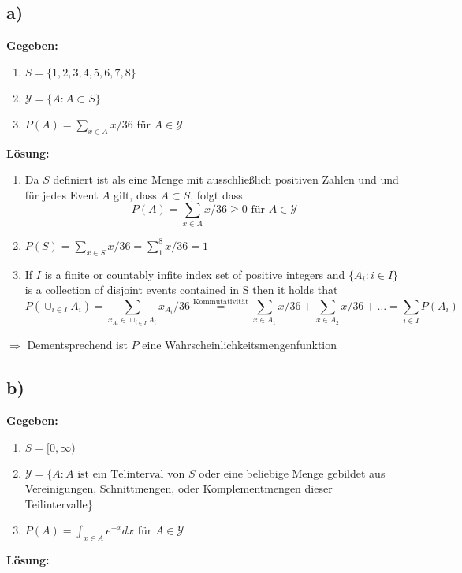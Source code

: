 \documentclass{article}
\begin{document}
\subsection*{a)}
\textbf{Gegeben:}


\begin{enumerate}
    \item $S = \{1,2,3,4,5,6,7,8\}$ 
    \item $\mathcal{Y} = \{A: A \subset S\}$ 
    \item $P(A) = \sum_{x\in A} x / 36$ für $A \in \mathcal{Y}$
\end{enumerate}
\textbf{Lösung:}


\begin{enumerate}[label=zu \roman*.]
    \item Da $S$ definiert ist als eine Menge mit ausschließlich positiven Zahlen und und für jedes Event $A$ gilt, dass $A \subset S$, folgt dass \[P(A) = \sum_{x\in A} x / 36 \geq 0 \text{ für }A \in \mathcal{Y}\]
    \item $P(S) = \sum_{x \in S} x/36 = \sum_{1}^{8}x/36 = 1$
    \item If $I$ is a finite or countably infite index set of positive integers and $\{A_{i}: i \in I\}$ is a collection of disjoint events contained in S then it holds that \[P(\cup_{i\in I}A_{i}) = \sum_{x_{A_{i}} \in \cup_{i\in I}A_{i}}x_{A_{i}}/36 \overset{\text{Kommutativität}}{=} \sum_{x \in A_{1}} x/36 + \sum_{x \in A_{2}} x/36 + \ldots = \sum_{i\in I}P(A_{i})\]  
\end{enumerate}

$\Longrightarrow$ Dementsprechend ist $P$ eine Wahrscheinlichkeitsmengenfunktion

\subsection*{b)}
\textbf{Gegeben:}


\begin{enumerate}
    \item $S = [0,\infty)$ 
    \item $\mathcal{Y} = \{A: A \text{ ist ein Telinterval von  } S $ oder eine beliebige Menge gebildet aus Vereinigungen, Schnittmengen, oder Komplementmengen dieser Teilintervalle\}
    \item $P(A) = \int_{x\in A} e^{-x} dx$ für $A \in \mathcal{Y}$
\end{enumerate}
\textbf{Lösung:}
\end{document}
